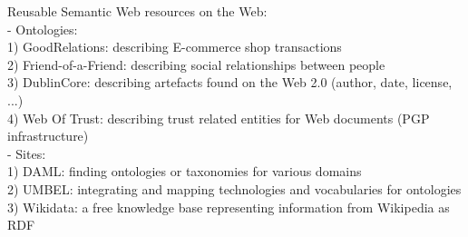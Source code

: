 \begin{appendices}
Reusable Semantic Web resources on the Web: \\
- Ontologies: \\
	1) GoodRelations: describing E-commerce shop transactions \\
	2) Friend-of-a-Friend: describing social relationships between people \\
	3) DublinCore: describing artefacts found on the Web 2.0 (author, date, license, ...) \\
	4) Web Of Trust: describing trust related entities for Web documents (PGP infrastructure) \\
- Sites: \\
  1) DAML: finding ontologies or taxonomies for various domains \\
	2) UMBEL: integrating and mapping technologies and vocabularies for ontologies \\
	3) Wikidata: a free knowledge base representing information from Wikipedia as RDF \\
\\


\end{appendices}
